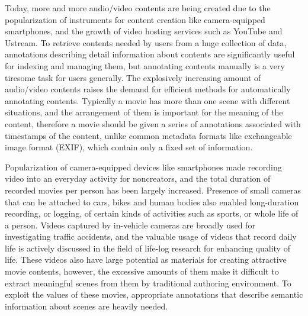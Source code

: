 Today, more and more audio/video contents are being created due to the popularization of instruments for content creation like camera-equipped smartphones, and the growth of video hosting services such as YouTube and Ustream.
To retrieve contents needed by users from a huge collection of data, annotations describing detail information about contents are significantly useful for indexing and managing them, but annotating contents manually is a very tiresome task for users generally.
The explosively increasing amount of audio/video contents raises the demand for efficient methods for automatically annotating contents.
Typically a movie has more than one scene with different situations, and the arrangement of them is important for the meaning of the content, therefore a movie should be given a series of annotations associated with timestamps of the content, unlike common metadata formats like exchangeable image format (EXIF), which contain only a fixed set of information.

Popularization of camera-equipped devices like smartphones made recording video into an everyday activity for noncreators, and the total duration of recorded movies per person has been largely increased.
Presence of small cameras that can be attached to cars, bikes and human bodies also enabled long-duration recording, or logging, of certain kinds of activities such as sports, or whole life of a person.
Videos captured by in-vehicle cameras are broadly used for investigating traffic accidents, and the valuable usage of videos that record daily life is actively discussed in the field of life-log research for enhancing quality of life.
These videos also have large potential as materials for creating attractive movie contents, however, the excessive amounts of them make it difficult to extract meaningful scenes from them by traditional authoring environment.
To exploit the values of these movies, appropriate annotations that describe semantic information about scenes are heavily needed.

